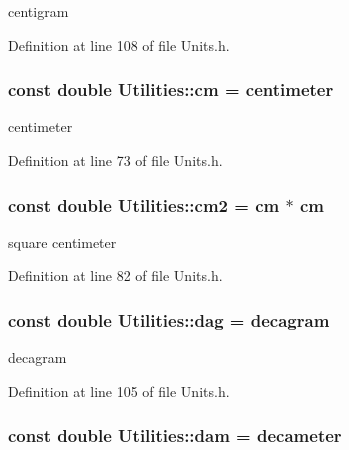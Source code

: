 centigram 



Definition at line 108 of file Units.h.

\hypertarget{namespace_utilities_a43701408f4de13788368dce37066801f}{
\subsubsection[{cm}]{\setlength{\rightskip}{0pt plus 5cm}const double {\bf Utilities::cm} = {\bf centimeter}}}
\label{namespace_utilities_a43701408f4de13788368dce37066801f}


centimeter 



Definition at line 73 of file Units.h.

\hypertarget{namespace_utilities_af8cd4e9cca8050523bb9ef0cc0519250}{
\subsubsection[{cm2}]{\setlength{\rightskip}{0pt plus 5cm}const double {\bf Utilities::cm2} = {\bf cm} $\ast$ {\bf cm}}}
\label{namespace_utilities_af8cd4e9cca8050523bb9ef0cc0519250}


square centimeter 



Definition at line 82 of file Units.h.

\hypertarget{namespace_utilities_a1a052c7a7614fc92834c71bc8029e0b3}{
\subsubsection[{dag}]{\setlength{\rightskip}{0pt plus 5cm}const double {\bf Utilities::dag} = {\bf decagram}}}
\label{namespace_utilities_a1a052c7a7614fc92834c71bc8029e0b3}


decagram 



Definition at line 105 of file Units.h.

\hypertarget{namespace_utilities_ad242ea541744880484ba811bc49fb881}{
\subsubsection[{dam}]{\setlength{\rightskip}{0pt plus 5cm}const double {\bf Utilities::dam} = {\bf decameter}}}
\label{namespace_utilities_ad242ea541744880484ba811bc49fb881}


